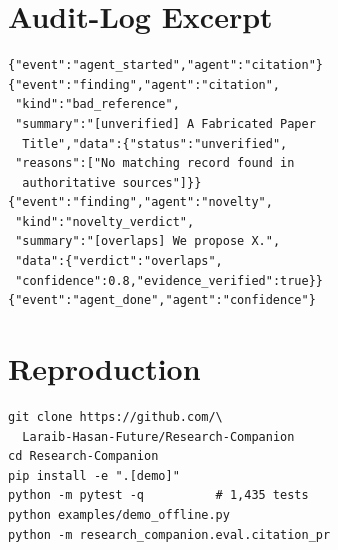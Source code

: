 \documentclass[11pt]{article}
\begin{document}


\appendix
\section{Audit-Log Excerpt}
\begin{small}
\begin{verbatim}
{"event":"agent_started","agent":"citation"}
{"event":"finding","agent":"citation",
 "kind":"bad_reference",
 "summary":"[unverified] A Fabricated Paper
  Title","data":{"status":"unverified",
 "reasons":["No matching record found in
  authoritative sources"]}}
{"event":"finding","agent":"novelty",
 "kind":"novelty_verdict",
 "summary":"[overlaps] We propose X.",
 "data":{"verdict":"overlaps",
 "confidence":0.8,"evidence_verified":true}}
{"event":"agent_done","agent":"confidence"}
\end{verbatim}
\end{small}

\section{Reproduction}
\begin{small}
\begin{verbatim}
git clone https://github.com/\
  Laraib-Hasan-Future/Research-Companion
cd Research-Companion
pip install -e ".[demo]"
python -m pytest -q          # 1,435 tests
python examples/demo_offline.py
python -m research_companion.eval.citation_pr
\end{verbatim}
\end{small}
\end{document}
